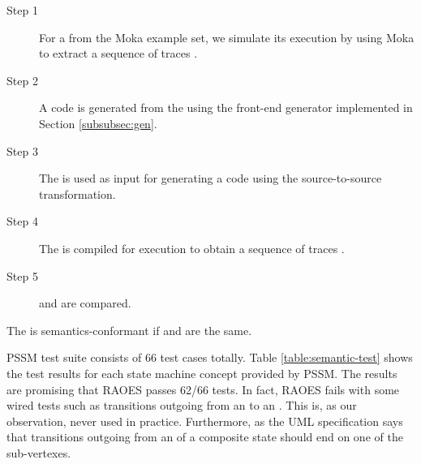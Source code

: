 \begin{description}
	\item[Step 1] For a  from the Moka example set, we simulate its execution by using Moka to extract a sequence of traces .
	
	\item[Step 2] A  code is generated from the  using the front-end generator implemented in Section \ref{subsubsec:gen}.
	
	\item[Step 3] The  is used as input for generating a  code using the source-to-source transformation.
	
	\item[Step 4] The  is compiled for execution to obtain a sequence of traces .
	
	\item[Step 5]  and  are compared.  
\end{description}

The  is semantics-conformant if  and  are the same.




PSSM test suite consists of 66 test cases totally.
Table \ref{table:semantic-test} shows the test results for each state machine concept provided by PSSM. 
The results are promising that RAOES passes 62/66 tests. 
In fact, RAOES fails with some wired tests such as transitions outgoing from an  to an . 
This is, as our observation, never used in practice. 
Furthermore, as the UML specification says that transitions outgoing from an  of a composite state should end on one of the sub-vertexes.

